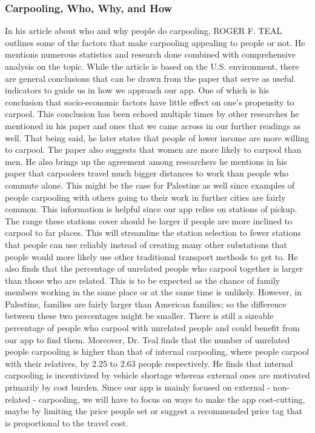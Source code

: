 \documentclass[a4paper, 12pt]{report} %
\begin{document}
            \subsubsection{Carpooling, Who, Why, and How}
                In his article about who and why people do carpooling, ROGER F. TEAL \cite{carpool_who_why_how} outlines some of the factors that make carpooling appealing to people or not. He mentions numerous statistics and research done combined with comprehensive analysis on the topic. While the article is based on the U.S. environment, there are general conclusions that can be drawn from the paper that serve as useful indicators to guide us in how we approach our app. One of which is his conclusion that socio-economic factors have little effect on one's propensity to carpool. This conclusion has been echoed multiple times by other researches he mentioned in his paper and ones that we came across in our further readings as well. That being said, he later states that people of lower income are more willing to carpool. The paper also suggests that women are more likely to carpool than men. He also brings up the agreement among researchers he mentions in his paper that carpoolers travel much bigger distances to work than people who commute alone. This might be the case for Palestine as well since examples of people carpooling with others going to their work in further cities are fairly common. This information is helpful since our app relies on stations of pickup. The range these stations cover should be larger if people are more inclined to carpool to far places. This will streamline the station selection to fewer stations that people can use reliably instead of creating many other substations that people would more likely use other traditional transport methods to get to. He also finds that the percentage of unrelated people who carpool together is larger than those who are related. This is to be expected as the chance of family members working in the same place or at the same time is unlikely. However, in Palestine, families are fairly larger than American families; so the difference between these two percentages might be smaller. There is still a sizeable percentage of people who carpool with unrelated people and could benefit from our app to find them. Moreover, Dr. Teal finds that the number of unrelated people carpooling is higher than that of internal carpooling, where people carpool with their relatives, by 2.25 to 2.63 people respectively. He finds that internal carpooling is incentivized by vehicle shortage whereas external ones are motivated primarily by cost burden.\cite{carpool_who_why_how} Since our app is mainly focused on external - non-related - carpooling, we will have to focus on ways to make the app cost-cutting, maybe by limiting the price people set or suggest a recommended price tag that is proportional to the travel cost.
                
\end{document}
